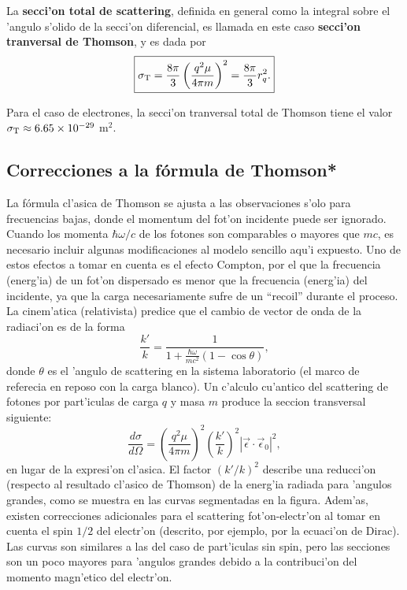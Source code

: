 La \textbf{secci'on total de scattering}, definida en general como la integral sobre el 'angulo s'olido de la secci'on diferencial, es llamada en este caso \textbf{secci'on tranversal de Thomson}, y es dada por
\begin{equation}
\boxed{\sigma_{\rm T}=\frac{8\pi}{3}\left(\frac{q^2\mu}{4\pi m}\right)^2=\frac{8\pi}{3} r_q^2.}
\end{equation}

Para el caso de electrones, la secci'on tranversal total de Thomson tiene el valor $\sigma_{\rm T}\approx 6.65\times 10^{-29}$ m$^2$.

\subsection{Correcciones a la fórmula de Thomson*}
La fórmula cl'asica de Thomson se ajusta a las observaciones s'olo para frecuencias bajas, donde el momentum del fot'on incidente puede ser ignorado. Cuando los momenta $\hbar\omega/c$ de los fotones son comparables o mayores que $mc$, es necesario incluir algunas modificaciones al modelo sencillo aqu'i expuesto. Uno de estos efectos a tomar en cuenta es el efecto Compton, por el que la frecuencia (energ'ia) de un fot'on dispersado es menor que la frecuencia (energ'ia) del incidente, ya que la carga necesariamente sufre de un ``recoil'' durante el proceso. La cinem'atica (relativista) predice que el cambio de vector de onda de la radiaci'on es de la forma
\begin{equation}
\frac{k'}{k}=\frac{1}{1+\frac{\hbar\omega}{mc^2}\left(  1-\cos
\theta\right)  }, \label{Thomson}
\end{equation}
donde $\theta$ es el 'angulo de scattering en la sistema laboratorio (el marco
de referecia en reposo con la carga blanco). Un c'alculo cu'antico del
scattering de fotones por part'iculas de carga $q$ y masa $m$ produce la seccion
transversal siguiente:
\begin{equation}
\frac{d\sigma}{d\Omega}=\left(\frac{q^2\mu}{4\pi m}\right)^2  \left(
\frac{k'}{k}\right)^2\left|  \vec{\epsilon}\cdot\vec{\epsilon}_0\right|
^2 , \label{Thomson-corr}
\end{equation}
en lugar de la expresi'on cl'asica. El factor $(k'/k)^2$ describe una
reducci'on  (respecto al resultado cl'asico de Thomson) de la energ'ia radiada
para 'angulos grandes, como se muestra en las curvas segmentadas en la figura.
Adem'as, existen correcciones adicionales para el scattering fot'on-electr'on al
tomar en cuenta el spin ${1}/{2}$ del electr'on (descrito, por ejemplo, por
la ecuaci'on de Dirac). Las curvas son similares a las del caso de part'iculas
sin spin, pero las secciones son un poco mayores para 'angulos grandes debido a
la contribuci'on del momento magn'etico del electr'on.

